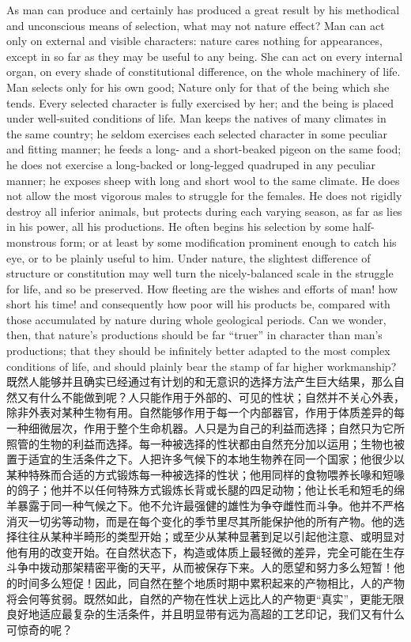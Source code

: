 \darwinpair
{As man can produce and certainly has produced a great result by his methodical and unconscious means of selection, what may not nature effect? Man can act only on external and visible characters: nature cares nothing for appearances, except in so far as they may be useful to any being. She can act on every internal organ, on every shade of constitutional difference, on the whole machinery of life. Man selects only for his own good; Nature only for that of the being which she tends. Every selected character is fully exercised by her; and the being is placed under well-suited conditions of life. Man keeps the natives of many climates in the same country; he seldom exercises each selected character in some peculiar and fitting manner; he feeds a long- and a short-beaked pigeon on the same food; he does not exercise a long-backed or long-legged quadruped in any peculiar manner; he exposes sheep with long and short wool to the same climate. He does not allow the most vigorous males to struggle for the females. He does not rigidly destroy all inferior animals, but protects during each varying season, as far as lies in his power, all his productions. He often begins his selection by some half-monstrous form; or at least by some modification prominent enough to catch his eye, or to be plainly useful to him. Under nature, the slightest difference of structure or constitution may well turn the nicely-balanced scale in the struggle for life, and so be preserved. How fleeting are the wishes and efforts of man! how short his time! and consequently how poor will his products be, compared with those accumulated by nature during whole geological periods. Can we wonder, then, that nature's productions should be far “truer” in character than man's productions; that they should be infinitely better adapted to the most complex conditions of life, and should plainly bear the stamp of far higher workmanship?}
{既然人能够并且确实已经通过有计划的和无意识的选择方法产生巨大结果，那么自然又有什么不能做到呢？人只能作用于外部的、可见的性状；自然并不关心外表，除非外表对某种生物有用。自然能够作用于每一个内部器官，作用于体质差异的每一种细微层次，作用于整个生命机器。人只是为自己的利益而选择；自然只为它所照管的生物的利益而选择。每一种被选择的性状都由自然充分加以运用；生物也被置于适宜的生活条件之下。人把许多气候下的本地生物养在同一个国家；他很少以某种特殊而合适的方式锻炼每一种被选择的性状；他用同样的食物喂养长喙和短喙的鸽子；他并不以任何特殊方式锻炼长背或长腿的四足动物；他让长毛和短毛的绵羊暴露于同一种气候之下。他不允许最强健的雄性为争夺雌性而斗争。他并不严格消灭一切劣等动物，而是在每个变化的季节里尽其所能保护他的所有产物。他的选择往往从某种半畸形的类型开始；或至少从某种显著到足以引起他注意、或明显对他有用的改变开始。在自然状态下，构造或体质上最轻微的差异，完全可能在生存斗争中拨动那架精密平衡的天平，从而被保存下来。人的愿望和努力多么短暂！他的时间多么短促！因此，同自然在整个地质时期中累积起来的产物相比，人的产物将会何等贫弱。既然如此，自然的产物在性状上远比人的产物更“真实”，更能无限良好地适应最复杂的生活条件，并且明显带有远为高超的工艺印记，我们又有什么可惊奇的呢？}

